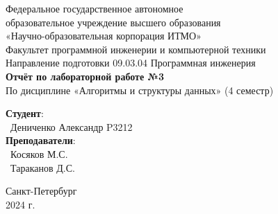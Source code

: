 \documentclass{article}
\begin{document}
\begin{center}
    \Large
    Федеральное государственное автономное \\
    образовательное учреждение высшего образования \\ 
    «Научно-образовательная корпорация ИТМО»\\
    \vspace{0.5cm}
    \large
    Факультет программной инженерии и компьютерной техники \\
    Направление подготовки 09.03.04 Программная инженерия \\
    \vspace{1cm}
    \Large
    \textbf{Отчёт по лабораторной работе №3} \\
    По дисциплине «Алгоритмы и структуры данных» (4 семестр)\\
    \large
    \vspace{8cm}

    \begin{minipage}{.33\textwidth}
    \end{minipage}
    \hfill
    \begin{minipage}{.4\textwidth}
    
        \textbf{Студент}: \vspace{.1cm} \\
        \ Дениченко Александр P3212 \vspace{.1cm}\\
        \textbf{Преподаватели}:  \vspace{.1cm}\\
        \ Косяков М.С. \\
        \ Тараканов Д.С.
    \end{minipage}
    \vfill
Санкт-Петербург\\ 2024 г.
\end{center}

\newpage
\end{document}
